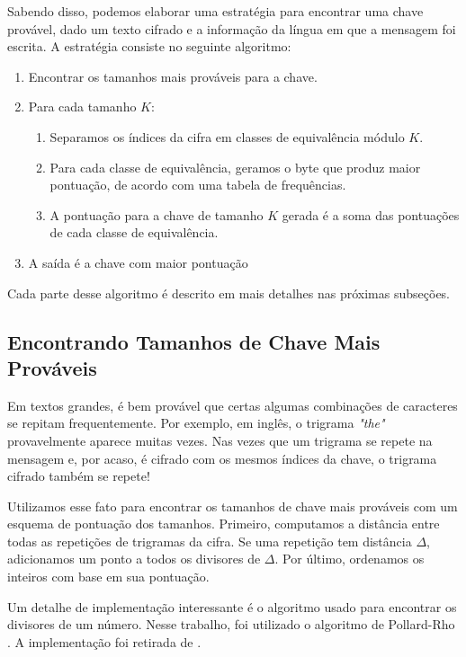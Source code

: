 \documentclass[conference]{IEEEtran}
\begin{document}
Sabendo disso, podemos elaborar uma estratégia para encontrar uma chave
provável, dado um texto cifrado e a informação da língua em que a mensagem foi
escrita. A estratégia consiste no seguinte algoritmo:

\begin{enumerate}
    \item Encontrar os tamanhos mais prováveis para a chave.
    \item Para cada tamanho $K$:
        \begin{enumerate}
            \item Separamos os índices da cifra em classes de equivalência
                módulo $K$.
            \item Para cada classe de equivalência, geramos o byte que produz
                maior pontuação, de acordo com uma tabela de frequências. 
            \item A pontuação para a chave de tamanho $K$ gerada é a soma das
                pontuações de cada classe de equivalência.
        \end{enumerate}
    \item A saída é a chave com maior pontuação
\end{enumerate}

Cada parte desse algoritmo é descrito em mais detalhes nas próximas subseções.  

\subsection{Encontrando Tamanhos de Chave Mais Prováveis}
\label{sec:tamanhos}

Em textos grandes, é bem provável que certas algumas combinações de caracteres
se repitam frequentemente. Por exemplo, em inglês, o trigrama \textit{"the"}
provavelmente aparece muitas vezes. Nas vezes que um trigrama se repete na
mensagem e, por acaso, é cifrado com os mesmos índices da chave, o trigrama
cifrado também se repete!

Utilizamos esse fato para encontrar os tamanhos de chave mais prováveis com um
esquema de pontuação dos tamanhos. Primeiro, computamos a distância entre todas
as repetições de trigramas da cifra. Se uma repetição tem distância $\Delta $,
adicionamos um ponto a todos os divisores de $\Delta $. Por último, ordenamos os
inteiros com base em sua pontuação.

Um detalhe de implementação interessante é o algoritmo usado para encontrar os
divisores de um número. Nesse trabalho, foi utilizado o algoritmo de Pollard-Rho
\cite{pollard-rho}. A implementação foi retirada de \cite{pollard-rho-tiago}.
\end{document}
